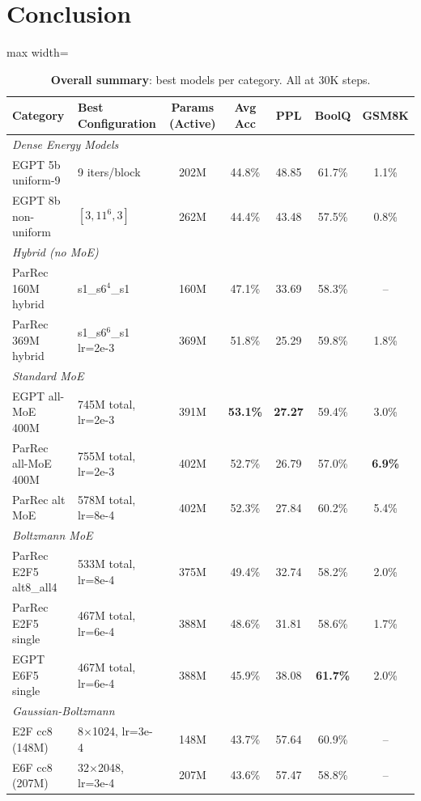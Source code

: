 \documentclass[oneside]{article}
\begin{document}
\section{Conclusion}

\begin{table}[t]
\centering
\caption{\textbf{Overall summary}: best models per category. All at 30K steps.}
\label{tab:summary}
\begin{adjustbox}{max width=\textwidth}
\begin{tabular}{llccccc}
\toprule
\textbf{Category} & \textbf{Best Configuration} & \textbf{Params (Active)} & \textbf{Avg Acc} & \textbf{PPL} & \textbf{BoolQ} & \textbf{GSM8K} \\
\midrule
\multicolumn{7}{l}{\textit{Dense Energy Models}} \\
EGPT 5b uniform-9              & 9 iters/block             & 202M & 44.8\% & 48.85 & 61.7\% & 1.1\% \\
EGPT 8b non-uniform            & $[3,11^6,3]$              & 262M & 44.4\% & 43.48 & 57.5\% & 0.8\% \\
\midrule
\multicolumn{7}{l}{\textit{Hybrid (no MoE)}} \\
ParRec 160M hybrid             & s1\_s6$^4$\_s1            & 160M & 47.1\% & 33.69 & 58.3\% & -- \\
ParRec 369M hybrid             & s1\_s6$^6$\_s1 lr=2e-3    & 369M & 51.8\% & 25.29 & 59.8\% & 1.8\% \\
\midrule
\multicolumn{7}{l}{\textit{Standard MoE}} \\
EGPT all-MoE 400M              & 745M total, lr=2e-3       & 391M & \textbf{53.1\%} & \textbf{27.27} & 59.4\% & 3.0\% \\
ParRec all-MoE 400M            & 755M total, lr=2e-3       & 402M & 52.7\% & 26.79 & 57.0\% & \textbf{6.9\%} \\
ParRec alt MoE                 & 578M total, lr=8e-4       & 402M & 52.3\% & 27.84 & 60.2\% & 5.4\% \\
\midrule
\multicolumn{7}{l}{\textit{Boltzmann MoE}} \\
ParRec E2F5 alt8\_all4         & 533M total, lr=8e-4       & 375M & 49.4\% & 32.74 & 58.2\% & 2.0\% \\
ParRec E2F5 single             & 467M total, lr=6e-4       & 388M & 48.6\% & 31.81 & 58.6\% & 1.7\% \\
EGPT E6F5 single               & 467M total, lr=6e-4       & 388M & 45.9\% & 38.08 & \textbf{61.7\%} & 2.0\% \\
\midrule
\multicolumn{7}{l}{\textit{Gaussian-Boltzmann}} \\
E2F cc8 (148M)                 & 8$\times$1024, lr=3e-4    & 148M & 43.7\% & 57.64 & 60.9\% & -- \\
E6F cc8 (207M)                 & 32$\times$2048, lr=3e-4   & 207M & 43.6\% & 57.47 & 58.8\% & -- \\
\bottomrule
\end{tabular}
\end{adjustbox}
\end{table}
\end{document}
